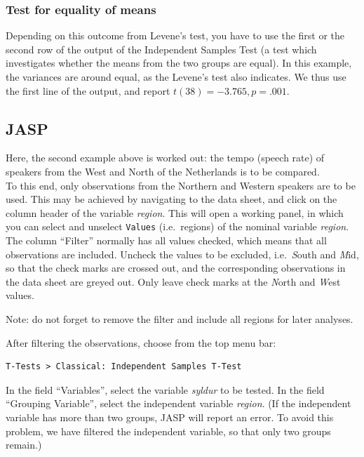 \documentclass[
]{book}
\begin{document}
\hypertarget{test-for-equality-of-means}{%
\subsubsection{Test for equality of means}\label{test-for-equality-of-means}}

Depending on this outcome from Levene's test, you have to use the first
or the second row of the output of the Independent Samples Test
(a test which investigates whether the means from the two groups are equal).
In this example, the variances are around equal, as the
Levene's test also indicates. We thus use the first line of the output,
and report \(t(38)=-3.765, p=.001\).

\hypertarget{sec:JASP-ttest-unpaired}{%
\subsection{JASP}\label{sec:JASP-ttest-unpaired}}

Here, the second example above is worked out: the tempo (speech rate) of speakers from the West and North of the Netherlands is to be compared.\\
To this end, only observations from the Northern and Western speakers are to be used. This may be achieved by navigating to the data sheet, and click on the column header of the variable \emph{region}. This will open a working panel, in which you can select and unselect \texttt{Values} (i.e.~regions) of the nominal variable \emph{region}. The column ``Filter'' normally has all values checked, which means that all observations are included. Uncheck the values to be excluded, i.e.~\emph{S}outh and \emph{M}id, so that the check marks are crossed out, and the corresponding observations in the data sheet are greyed out. Only leave check marks at the \emph{N}orth and \emph{W}est values.

Note: do not forget to remove the filter and include all regions for later analyses.

After filtering the observations, choose from the top menu bar:

\begin{verbatim}
T-Tests > Classical: Independent Samples T-Test
\end{verbatim}

In the field ``Variables'', select the variable \emph{syldur} to be tested.
In the field ``Grouping Variable'', select the independent variable \emph{region}. (If the independent variable has more than two groups, JASP will report an error. To avoid this problem, we have filtered the independent variable, so that only two groups remain.)\\
\end{document}
